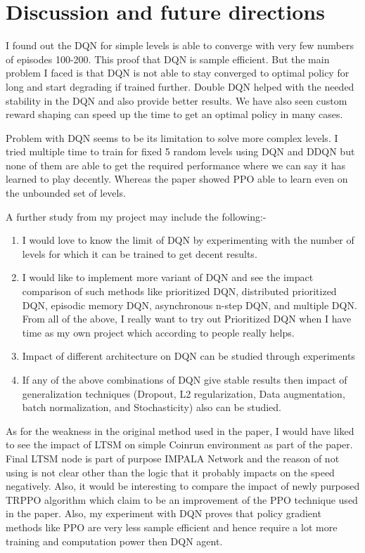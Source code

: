 \documentclass[10pt,twocolumn,letterpaper]{article}
\begin{document}
\section{Discussion and future directions}

I found out the DQN for simple levels is able to converge with very few numbers of episodes 100-200. This proof that DQN is sample efficient. But the main problem I faced is that DQN is not able to stay converged to optimal policy for long and start degrading if trained further. Double DQN helped with the needed stability in the DQN and also provide better results. We have also seen custom reward shaping can speed up the time to get an optimal policy in many cases. 

Problem with DQN seems to be its limitation to solve more complex levels. I tried multiple time to train for fixed 5 random levels using DQN and DDQN but none of them are able to get the required performance where we can say it has learned to play decently. Whereas the paper showed PPO able to learn even on the unbounded set of levels.

A further study from my project may include the following:-
\begin{enumerate}
    \item I would love to know the limit of DQN by experimenting with the number of levels for which it can be trained to get decent results.
    \item I would like to implement more variant of DQN and see the impact comparison of such methods like prioritized DQN, distributed prioritized DQN, episodic memory DQN, asynchronous n-step DQN, and multiple DQN. From all of the above, I really want to try out Prioritized DQN when I have time as my own project which according to people really helps.
    \item Impact of different architecture on DQN can be studied through experiments
    \item If any of the above combinations of DQN give stable results then impact of generalization techniques (Dropout, L2 regularization, Data augmentation, batch normalization, and Stochasticity) also can be studied.
\end{enumerate}

As for the weakness in the original method used in the paper, I would have liked to see the impact of LTSM on simple Coinrun environment as part of the paper. Final LTSM node is part of purpose IMPALA Network \cite{IMPALA} and the reason of not using is not clear other than the logic that it probably impacts on the speed negatively. Also, it would be interesting to compare the impact of newly purposed TRPPO algorithm \cite{TRPPO} which claim to be an improvement of the PPO \cite{PPO} technique used in the paper. Also, my experiment with DQN proves that policy gradient methods like PPO are very less sample efficient and hence require a lot more training and computation power then DQN agent. 


{\small


}
\end{document}
